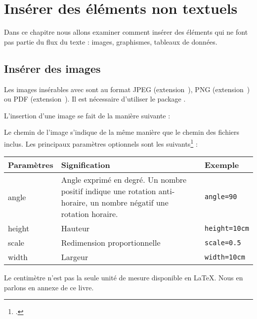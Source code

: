 \chapter{Insérer des éléments non textuels}

\begin{prealable}
    Dans ce chapitre nous allons examiner comment insérer des éléments qui ne font pas partie du flux du texte : images, graphismes, tableaux de données.
\end{prealable}

\section{Insérer des images}

Les images insérables avec \XeLaTeX sont au format JPEG (extension~), PNG (extension~) ou PDF (extension~). Il est nécessaire d'utiliser le package .


L'insertion d'une image se fait de la manière suivante : 

Le chemin de l'image s'indique de la même manière que le chemin des fichiers inclus.
Les principaux paramètres optionnels sont les suivants\footcite[Pour les autres, on consultera][]{graphicx_options} :

\begin{longtable}{|p{0.2\linewidth}|p{0.6\linewidth}|p{0.2\linewidth}|}
    \hline
    \centering\textbf{Paramètres} & \centering\textbf{Signification} & \centering\textbf{Exemple}    \tabularnewline
    \hline
    \endhead
    \hline
    \endfoot
    angle        & Angle exprimé en degré. Un nombre positif indique une rotation anti-horaire, un nombre négatif une rotation horaire.     & \verb|angle=90| \\
    height        & Hauteur    & \verb|height=10cm|     \\
    scale        & Redimension proportionnelle & \verb|scale=0.5|\\
    width        & Largeur     & \verb|width=10cm|     \\
\end{longtable}

\begin{plusloins}
Le centimètre n'est pas la seule  unité de mesure disponible en \LaTeX. Nous en parlons en annexe de ce livre.
\end{plusloins}


